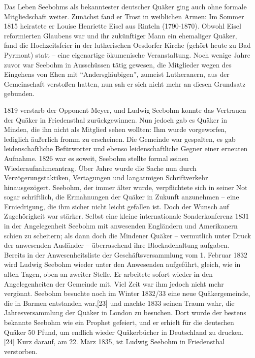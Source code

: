 \medskip

Das Leben Seebohms als bekanntester deutscher Quäker ging auch ohne formale
Mitgliedschaft weiter. Zunächst fand er Trost in weiblichen Armen: Im Sommer
1815 heiratete er Louise Henriette Eisel aus Rinteln (1790-1870). Obwohl Eisel
reformierten Glaubens war und ihr zukünftiger Mann ein ehemaliger Quäker, fand
die Hochzeitsfeier in der lutherischen Oesdorfer Kirche (gehört heute zu Bad
Pyrmont) statt – eine eigenartige ökumenische Veranstaltung. Noch wenige Jahre
zuvor war Seebohm in Ausschüssen tätig gewesen, die Mitglieder wegen des
Eingehens von Ehen mit "`Andersgläubigen"', zumeist Lutheranern, aus der
Gemeinschaft verstoßen hatten, nun sah er sich nicht mehr an diesen Grundsatz
gebunden.

\medskip

1819 verstarb der Opponent Meyer, und Ludwig Seebohm konnte das Vertrauen der
Quäker in Friedensthal zurückgewinnen. Nun jedoch gab es Quäker in Minden, die
ihn nicht als Mitglied sehen wollten: Ihm wurde vorgeworfen, lediglich äußerlich
fromm zu erscheinen. Die Gemeinde war gespalten, es gab leidenschaftliche
Befürworter und ebenso leidenschaftliche Gegner einer erneuten Aufnahme. 1826
war es soweit, Seebohm stellte formal seinen Wiederaufnahmeantrag. Über Jahre
wurde die Sache nun durch Verzögerungstaktiken, Vertagungen und langatmigen
Schriftverkehr hinausgezögert. Seebohm, der immer älter wurde, verpflichtete
sich in seiner Not sogar schriftlich, die Ermahnungen der Quäker in Zukunft
anzunehmen – eine Erniedrigung, die ihm sicher nicht leicht gefallen ist. Doch
der Wunsch auf Zugehörigkeit war stärker. Selbst eine kleine internationale
Sonderkonferenz 1831 in der Angelegenheit Seebohm mit anwesenden Engländern und
Amerikanern schien zu scheitern; als dann doch die Mindener Quäker – vermutlich
unter Druck der anwesenden Ausländer – überraschend ihre Blockadehaltung
aufgaben. Bereits in der Anwesenheitsliste der Geschäftsversammlung vom 1.
Februar 1832 wird Ludwig Seebohm wieder unter den Anwesenden aufgeführt, gleich,
wie in alten Tagen, oben an zweiter Stelle. Er arbeitete sofort wieder in den
Angelegenheiten der Gemeinde mit. Viel Zeit war ihm jedoch nicht mehr vergönnt.
Seebohm besuchte noch im Winter 1832/33 eine neue Quäkergemeinde, die in Barmen
entstanden war,[23] und machte 1833 seinen Traum wahr, die Jahresversammlung der
Quäker in London zu besuchen. Dort wurde der bestens bekannte Seebohm wie ein
Prophet gefeiert, und er erhielt für die deutschen Quäker 50 Pfund, um endlich
wieder Quäkerbücher in Deutschland zu drucken.[24] Kurz darauf, am 22. März
1835, ist Ludwig Seebohm in Friedensthal verstorben.

